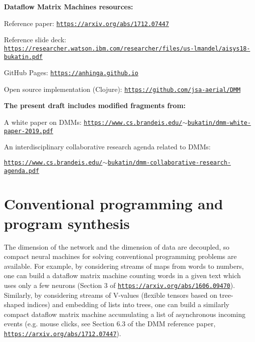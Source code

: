 \documentclass{article}
\begin{document}
\vspace{0.1in}
\noindent
{\bf Dataflow Matrix Machines resources:}

Reference paper: \href{https://arxiv.org/abs/1712.07447}{\tt https://arxiv.org/abs/1712.07447}

Reference slide deck: \href{https://researcher.watson.ibm.com/researcher/files/us-lmandel/aisys18-bukatin.pdf}{\footnotesize\tt https://researcher.watson.ibm.com/researcher/files/us-lmandel/aisys18-bukatin.pdf}

GitHub Pages: \href{https://anhinga.github.io/}{\tt https://anhinga.github.io}

Open source implementation (Clojure): \href{https://github.com/jsa-aerial/DMM}{\tt https://github.com/jsa-aerial/DMM}

\vspace{0.1in}
\noindent
{\bf The present draft includes modified fragments from:}

A white paper on DMMs: \href{https://www.cs.brandeis.edu/~bukatin/dmm-white-paper-2019.pdf}{\footnotesize\tt https://www.cs.brandeis.edu/$\sim$bukatin/dmm-white-paper-2019.pdf}

An interdisciplinary collaborative research agenda related to DMMs:

\hspace{0.3in}\href{https://www.cs.brandeis.edu/~bukatin/dmm-collaborative-research-agenda.pdf}{\tt https://www.cs.brandeis.edu/$\sim$bukatin/dmm-collaborative-research-agenda.pdf}


\section{Conventional programming and program synthesis} The dimension of the network and the dimension
of data are decoupled, so compact neural machines for solving conventional programming problems are available.
For example, by considering streams of maps from words to numbers, one can build a dataflow matrix machine
counting words in a given text which uses only a few neurons 
(Section 3 of \href{https://arxiv.org/abs/1606.09470}{\tt https://arxiv.org/abs/1606.09470}).
Similarly, by considering streams of V-values  (flexible tensors based on tree-shaped indices) and embedding
of lists into trees, one can build a similarly compact dataflow matrix machine
accumulating a list of asynchronous incoming events
(e.g. mouse clicks, see Section 6.3 of the DMM reference paper, \href{https://arxiv.org/abs/1712.07447}{\tt https://arxiv.org/abs/1712.07447}). 
\end{document}
